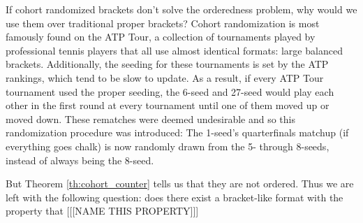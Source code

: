 {    If cohort randomized brackets don't solve the orderedness problem, why would we use them over traditional proper brackets? Cohort randomization is most famously found on the ATP Tour, a collection of tournaments played by professional tennis players that all use almost identical formats: large balanced brackets. Additionally, the seeding for these tournaments is set by the ATP rankings, which tend to be slow to update. As a result, if every ATP Tour tournament used the proper seeding, the 6-seed and 27-seed would play each other in the first round at every tournament until one of them moved up or moved down. These rematches were deemed undesirable and so this randomization procedure was introduced: The 1-seed's quarterfinals matchup (if everything goes chalk) is now randomly drawn from the 5- through 8-seeds, instead of always being the 8-seed.

    But Theorem \ref{th:cohort_counter} tells us that they are not ordered. Thus we are left with the following question: does there exist a bracket-like format with the property that 
    [[[NAME THIS PROPERTY]]]
    
}
